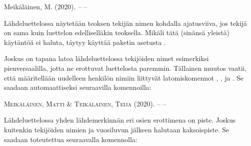 \begin{koodilohkosis}
\usepackage[…, giveninits]{biblatex}
\end{koodilohkosis}

\begin{tulossis}
  Meikäläinen, M. (2020). -- --
\end{tulossis}

\noindent
Lähdeluettelossa näytetään teoksen tekijän nimen kohdalla ajatusviiva,
jos tekijä on sama kuin luettelon edelliselläkin teoksella. Mikäli tätä
(sinänsä yleistä) käytäntöä ei haluta, täytyy käyttää paketin asetusta
.

\begin{koodilohkosis}
\usepackage[…, dashed=false]{biblatex}
\end{koodilohkosis}

\noindent
Joskus on tapana latoa lähdeluettelossa tekijöiden nimet esimerkiksi
pienversaalilla, jotta ne erottuvat luettelosta paremmin. Tällainen
muutos vaatii, että määritellään uudelleen henkilön nimiin liittyvät
latomiskomennot , ,
 ja . Se saadaan
automaattiseksi seuraavilla komennoilla:

\begin{koodilohkosis}
\end{koodilohkosis}

\begin{tulossis}
  \textsc{Meikäläinen}, \textsc{Matti} \& \textsc{Teikäläinen},
  \textsc{Teija} (2020). -- --
\end{tulossis}

\noindent
Lähdeluettelossa yhden lähdemerkinnän eri osien erottimena on piste.
Joskus kuitenkin tekijöiden nimien ja vuosiluvun jälkeen halutaan
kaksoispiste. Se saadaan toteutettua seuraavalla komennolla:

\begin{koodilohkosis}
\end{koodilohkosis}

